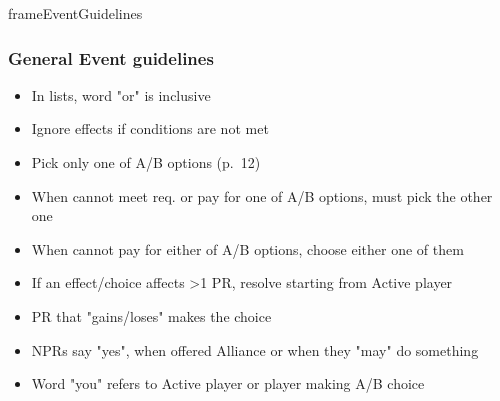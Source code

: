\documentclass[10pt]{article}
\newlength{\fhEventGuidelines} \setlength\fhEventGuidelines{35.5\baselineskip}
\begin{document}
\begin{dynamiccontents*}{frameEventGuidelines}\begin{eubox}{\fhEventGuidelines}
	\begin{multicols*}{2}
		\subsubsection*{General Event guidelines }
		\begin{itemize}
			\item In lists, word "or" is inclusive
			\item Ignore effects if conditions are not met
			\item Pick only one of A/B options (p.~12)
			\item When cannot meet req. or pay for one of A/B options, must pick the other one
			\item When cannot pay for either of A/B options, choose either one of them
			\item If an effect/choice affects >1 PR, resolve starting from Active player
			\item PR that "gains/loses" makes the choice
			\item NPRs say "yes", when offered Alliance or when they "may" do something
			\item Word "you" refers to Active player or player making A/B choice
		\end{itemize}
		

\end{multicols*}
\end{eubox}
\end{dynamiccontents*}
\end{document}
